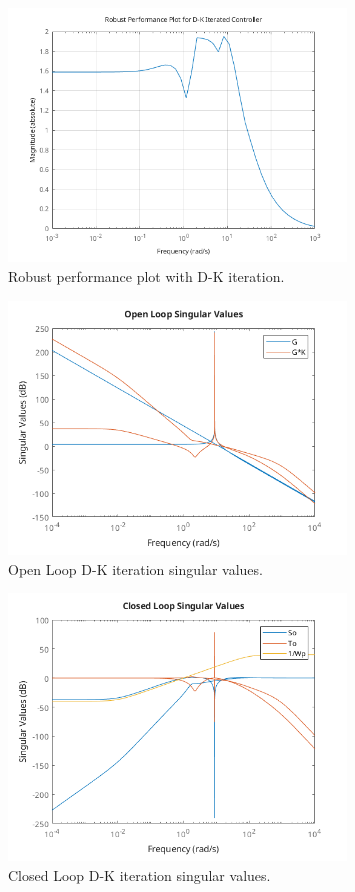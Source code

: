 \documentclass{article}
\begin{document}
\begin{figure}[H]
    \centering
    \includegraphics[width=0.8\textwidth]{rpDK.png}
    \caption{Robust performance plot with D-K iteration.}
    \label{fig:rpDK}
\end{figure}

\begin{figure}[H]
    \centering
    \includegraphics[width=0.8\textwidth]{dkOLsv.png}
    \caption{Open Loop D-K iteration singular values.}
    \label{fig:dkOLsv}
\end{figure}

\begin{figure}[H]
    \centering
    \includegraphics[width=0.8\textwidth]{dkCLsv.png}
    \caption{Closed Loop D-K iteration singular values.}
    \label{fig:dkCLsv}
\end{figure}
\end{document}
